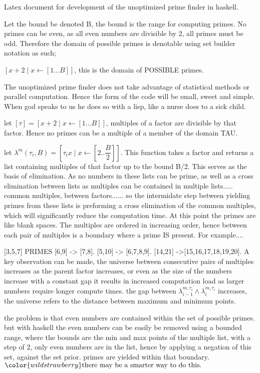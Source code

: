 Latex document for development of the
unoptimized prime finder in haskell.

Let the bound be denoted B, the bound is the range for computing primes.
No primes can be even, as all even numbers are divisible by 2, all primes
must be odd. Therefore the domain of possible primes is denotable using
set builder notation as such;

$[x+2\mid x\leftarrow[1...B]]$, this is the domain of POSSIBLE primes.

The unoptimized prime finder does not take advantage of statistical methods
or parallel computation. Hence the form of the code will be small, sweet
and simple. When god speaks to us he does so with a lisp, like a nurse does
to a sick child.

let $[\tau]=[x+2\mid x\leftarrow[1...B]]$, multiples of a factor are divisible by that factor.
Hence no primes can be a multiple of a member of the domain TAU.

let $\lambda^m(\tau_i,B)= [\tau_i x\mid x\leftarrow[2..\dfrac{B}{2}]]$. This function takes a factor and returns a list containing
multiples of that factor up to the bound B/2. This serves as the basis of elimination. As no numbers
in these lists can be prime, as well as a cross elimination between lists as multiples can be contained
in multiple lists..... common multiples, between factors...... so the intermidate step between yielding primes
from these lists is preforming a cross elimination of the common multiples, which will significantly reduce the
computation time. At this point the primes are like blank spaces. The multiples are ordered in increasing order,
hence between each pair of multiples is a boundary where a prime IS present. For example....

[3,5,7] PRIMES
[6,9] ->  [7,8].
[5,10] -> [6,7,8,9].
[14,21] ->[15,16,17,18,19,20]. A key observation can be made, the universe between consecutive pairs of
multiples increases as the parent factor increases, or even as the size of the numbers increase with a constant
gap it results in increased computation load as larger numbers require longer compute times.
the gap between $\lambda^{m,\tau_i}_{i-1}\land\lambda^{m,\tau_i}_i$ increases, the universe refers to the distance between maximum and minimum points.

the problem is that even numbers are contained within the set of possible primes. but with haskell the even numbers
can be easily be removed using a bounded range, where the bounds are the min and max points of the multiple list, with
a step of 2, only even numbers are in the list, hence by applying a negation of this set, against the set prior.
primes are yielded within that boundary. $\color{wildstrawberry}\text{there may be a smarter way to do this.}$

